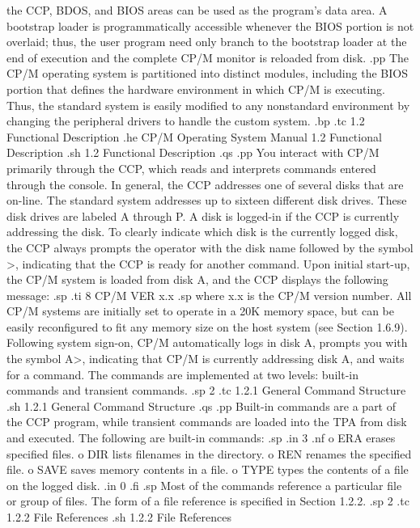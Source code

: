 the CCP, BDOS, and BIOS areas can be used as the program's data area.  
A bootstrap loader is programmatically accessible whenever the BIOS portion 
is not overlaid; thus, the user program need only branch to the bootstrap 
loader at the end of execution and the complete CP/M monitor is reloaded 
from disk.
.pp
The CP/M operating system is partitioned into distinct modules, including 
the BIOS portion that defines the hardware environment in which CP/M is 
executing.  Thus, the standard system is easily modified to any nonstandard 
environment by changing the peripheral drivers to handle the custom system.
.bp
.tc    1.2  Functional Description
.he CP/M Operating System Manual          1.2  Functional Description
.sh
1.2  Functional Description
.qs
.pp
You interact with CP/M primarily through the CCP, which reads and 
interprets commands entered through the console.  In general, the CCP 
addresses one of several disks that are on-line.  The standard system 
addresses up to sixteen different disk drives.  These disk drives are 
labeled A through P.  A disk is logged-in if the CCP is currently 
addressing the disk.  To clearly indicate which disk is the currently logged 
disk, the CCP always prompts the operator with the disk name followed by the 
symbol >, indicating that the CCP is ready for another command.  Upon 
initial start-up, the CP/M system is loaded from disk A, and the CCP 
displays the following message:
.sp
.ti 8
CP/M VER x.x
.sp
where x.x is the CP/M version number.  All CP/M systems are initially set 
to operate in a 20K memory space, but can be easily reconfigured to fit any 
memory size on the host system (see Section 1.6.9).  Following system 
sign-on, CP/M automatically logs in disk A, prompts you with the 
symbol A>, indicating that CP/M is currently addressing disk A, and 
waits for a command.  The commands are implemented at two levels:  built-in 
commands and transient commands.
.sp 2
.tc         1.2.1  General Command Structure
.sh
1.2.1  General Command Structure
.qs
.pp
Built-in commands are a part of the CCP program, while transient 
commands are loaded into the TPA from disk and executed.  The 
following are built-in commands:
.sp
.in 3
.nf
o ERA erases specified files.
o DIR lists filenames in the directory.
o REN renames the specified file.
o SAVE saves memory contents in a file.
o TYPE types the contents of a file on the logged disk.
.in 0
.fi
.sp
Most of the commands reference a particular file or group of files.  The 
form of a file reference is specified in Section 1.2.2.
.sp 2
.tc         1.2.2  File References
.sh
1.2.2  File References
